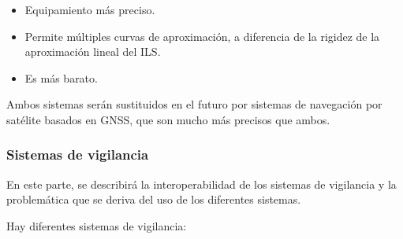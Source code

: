 \begin{enumerate}
    \begin{itemize}
        \item Equipamiento más preciso.
        \item Permite múltiples curvas de aproximación, a diferencia de la rigidez de la aproximación lineal del ILS.
        \item Es más barato.
    \end{itemize}
    
    Ambos sistemas serán sustituidos en el futuro por sistemas de navegación por satélite basados en GNSS, que son mucho más precisos que ambos.
\end{enumerate}

\subsubsection{Sistemas de vigilancia}

En este parte, se describirá la interoperabilidad de los sistemas de vigilancia y la problemática que se deriva del uso de los diferentes sistemas.

Hay diferentes sistemas de vigilancia:


